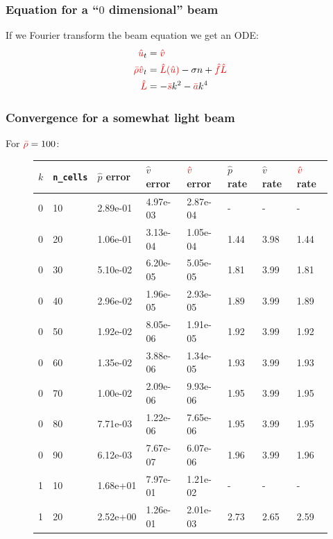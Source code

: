 \documentclass[8pt]{beamer}
\newcommand{\leftd}[1]{{\color{red} \bar{#1}}}
\newcommand{\leftFourier}[1]{{\color{red} \hat{#1}}}
\newcommand{\leftFourierTwo}[2]{{\color{red} \hat{#1}(\hat{#2})}}
\begin{document}
\begin{frame}
    \frametitle{Equation for a ``\(0\) dimensional'' beam}
    If we Fourier transform the beam equation we get an ODE:
    \begin{align}
        \leftFourier{u}_t              &= \leftFourier{v}                     \\
        \leftd{\rho} \leftFourier{v}_t &= \leftFourierTwo{L}{u}
        - \sigma n + \leftFourier{f} \leftFourier{L}                          \\
        \leftFourier{L} &= -\leftd{s} k^2 - \leftd{a} k^4
    \end{align}
\end{frame}

\begin{frame}
    \frametitle{Convergence for a somewhat light beam}
    For \(\leftd{\rho} = 100\):
    \begin{figure}
        \centering
        \begin{tabular}{| l | l | l | l | l | l | l | l |}
            \hline
            \(k\) & \texttt{n\_cells} &
            \(\hat{p}\) error & \(\hat{v}\) error & \(\leftFourier{v}\) error &
            \(\hat{p}\) rate & \(\hat{v}\) rate & \(\leftFourier{v}\) rate    \\
            \hline
            0 & 10 & 2.89e-01 & 4.97e-03 & 2.87e-04 & -    & -    & -         \\
            0 & 20 & 1.06e-01 & 3.13e-04 & 1.05e-04 & 1.44 & 3.98 & 1.44      \\
            0 & 30 & 5.10e-02 & 6.20e-05 & 5.05e-05 & 1.81 & 3.99 & 1.81      \\
            0 & 40 & 2.96e-02 & 1.96e-05 & 2.93e-05 & 1.89 & 3.99 & 1.89      \\
            0 & 50 & 1.92e-02 & 8.05e-06 & 1.91e-05 & 1.92 & 3.99 & 1.92      \\
            0 & 60 & 1.35e-02 & 3.88e-06 & 1.34e-05 & 1.93 & 3.99 & 1.93      \\
            0 & 70 & 1.00e-02 & 2.09e-06 & 9.93e-06 & 1.95 & 3.99 & 1.95      \\
            0 & 80 & 7.71e-03 & 1.22e-06 & 7.65e-06 & 1.95 & 3.99 & 1.95      \\
            0 & 90 & 6.12e-03 & 7.67e-07 & 6.07e-06 & 1.96 & 3.99 & 1.96      \\
            \hline
            1 & 10 & 1.68e+01 & 7.97e-01 & 1.21e-02 & -    & -    & -         \\
            1 & 20 & 2.52e+00 & 1.26e-01 & 2.01e-03 & 2.73 & 2.65 & 2.59      \\

\end{tabular}
\end{figure}
\end{frame}
\end{document}
